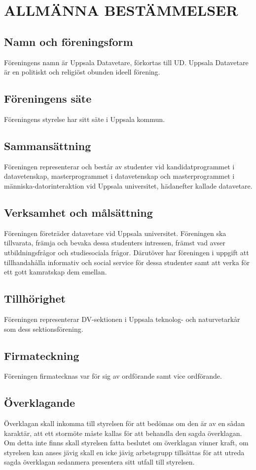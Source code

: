 \documentclass[a4paper]{article}
\begin{document}
\section{ALLMÄNNA BESTÄMMELSER}
{\subsection{Namn och föreningsform}
  Föreningens namn är Uppsala Datavetare, förkortas till UD. Uppsala Datavetare är en politiskt och religiöst obunden ideell förening.
  \subsection{Föreningens säte}
  Föreningens styrelse har sitt säte i Uppsala kommun.
  \subsection{Sammansättning}
  Föreningen representerar och består av studenter vid kandidatprogrammet i datavetenskap, masterprogrammet i datavetenskap och masterprogrammet i människa-datorinteraktion vid Uppsala universitet, hädanefter kallade datavetare.
  \subsection{Verksamhet och målsättning}
  Föreningen företräder datavetare vid Uppsala universitet. Föreningen ska tillvarata, främja och bevaka dessa studenters intressen, främst vad avser utbildningsfrågor och studiesociala frågor. Därutöver har föreningen i uppgift att tillhandahålla informativ och social service för dessa studenter samt att verka för ett gott kamratskap dem emellan.
  \subsection{Tillhörighet}
  Föreningen representerar DV-sektionen i Uppsala teknolog- och naturvetarkår som dess sektionsförening.
  \subsection{Firmateckning}
  Föreningen firmatecknas var för sig av ordförande samt vice ordförande.
  \subsection{Överklagande}
  Överklagan skall inkomma till styrelsen för att bedömas om den är av en sådan karaktär, att ett stormöte måste kallas för att behandla den sagda överklagan. Om detta inte finns skall styrelsen fatta beslutet om överklagan vinner kraft, om styrelsen kan anses jävig skall en icke jävig arbetsgrupp tillsättas för att utreda sagda överklagan sedanmera presentera sitt utfall till styrelsen.
}
\end{document}
